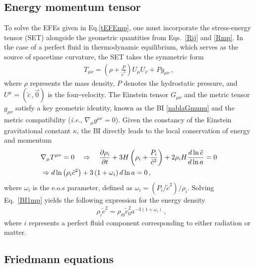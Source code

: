 \documentclass[jkps,preprint,fleqn]{revtex4} %
\newcommand{\tc}{\tilde{c}}
\begin{document}
\subsection{Energy momentum tensor}\label{subsec:Tmunu}

To solve the EFEs given in Eq.\eqref{tEFEmp}, one must incorporate the stress-energy tensor (SET) alongside the geometric quantities from Eqs.~\eqref{Rij} and \eqref{Rmp}. In the case of a perfect fluid in thermodynamic equilibrium, which serves as the source of spacetime curvature, the SET takes the symmetric form
 \begin{align} T_{\mu\nu} = \left( \rho + \frac{P}{\tc^2} \right) U_{\mu} U_{\nu} + P g_{\mu\nu} \label{Tmunump} \,, \end{align}
 where $\rho$ represents the mass density, $P$ denotes the hydrostatic pressure, and $U^{\mu} = (\tc\,,\vec{0})$ is the four-velocity. The Einstein tensor $G_{\mu\nu}$ and the metric tensor $g_{\mu\nu}$ satisfy a key geometric identity, known as the BI \eqref{nablaGmunu} and the metric compatibility (\textit{i.e.}, $\nabla_{\mu} g^{\mu\nu} = 0$). Given the constancy of the Einstein gravitational constant $\kappa$, the BI directly leads to the local conservation of energy and momentum
 \begin{align} &\nabla_{\mu} \tensor{T}{^\mu^\nu} = 0 \quad \Rightarrow \quad \frac{\partial \rho_i}{\partial t} + 3 H \left( \rho_i + \frac{P_i}{\tc^2} \right) + 2 \rho_i H \frac{d \ln \tc}{d \ln a} = 0 \nonumber \\ &\Rightarrow d \ln \left( \rho_i \tc^2 \right) + 3 \left( 1 + \omega_i \right) d \ln a = 0 \label{BI1mp} \,, \end{align}
 where $\omega_i$ is the e.o.s parameter, defined as $\omega_i = (P_i/\tc^2)/\rho_i$.
Solving Eq.~\eqref{BI1mp} yields the following expression for the energy density
 \begin{align} &\rho_i \tc^{2} = \rho_{i0} \tc_0^2 a^{-3 (1 + \omega_i)} \label{rhomp} \,,\end{align}
where $i$ represents a perfect fluid component corresponding to either radiation or matter.

\subsection{Friedmann equations}\label{subsec:FE}
\end{document}
